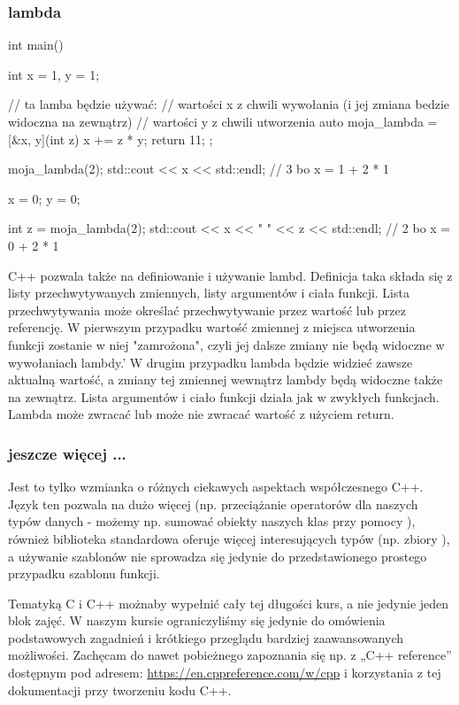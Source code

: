 \subsubsection{lambda}

\begin{CodeFrame*}[cpp]{}
int main() {
    int x = 1, y = 1;

    // ta lamba będzie używać:
    //  wartości x z chwili wywołania (i jej zmiana bedzie widoczna na zewnątrz)
    //  wartości y z chwili utworzenia
    auto moja_lambda = [&x, y](int z) { x += z * y; return 11; };

    moja_lambda(2);
    std::cout << x << std::endl; // 3 bo x = 1 + 2 * 1

    x = 0;
    y = 0;

    int z = moja_lambda(2);
    std::cout << x << " " << z << std::endl; // 2 bo x = 0 + 2 * 1
}
\end{CodeFrame*}

C++ pozwala także na definiowanie i używanie lambd.
Definicja taka składa się z listy przechwytywanych zmiennych, listy argumentów i ciała funkcji. Lista przechwytywania może określać przechwytywanie przez wartość lub przez referencję. W pierwszym przypadku wartość zmiennej z miejsca utworzenia funkcji zostanie w niej "zamrożona", czyli jej dalsze zmiany nie będą widoczne w wywołaniach lambdy.' W drugim przypadku lambda będzie widzieć zawsze aktualną wartość, a zmiany tej zmiennej wewnątrz lambdy będą widoczne także na zewnątrz. Lista argumentów i ciało funkcji działa jak w zwykłych funkcjach. Lambda może zwracać lub może nie zwracać wartość z użyciem return.

\subsubsection{jeszcze więcej ... }

Jest to tylko wzmianka o różnych ciekawych aspektach współczesnego C++. Język ten pozwala na dużo więcej (np. przeciążanie operatorów dla naszych typów danych - możemy np. sumować obiekty naszych klas przy pomocy \cpp{+}), również biblioteka standardowa oferuje więcej interesujących typów (np. zbiory ), a używanie szablonów nie sprowadza się jedynie do przedstawionego prostego przypadku szablonu funkcji.

Tematyką C i C++ możnaby wypełnić cały tej długości kurs, a nie jedynie jeden blok zajęć. W naszym kursie ograniczyliśmy się jedynie do omówienia podstawowych zagadnień i krótkiego przeglądu bardziej zaawansowanych możliwości. Zachęcam do nawet pobieżnego zapoznania się np. z „C++ reference” dostępnym pod adresem: \url{https://en.cppreference.com/w/cpp} i korzystania z tej dokumentacji przy tworzeniu kodu C++.
